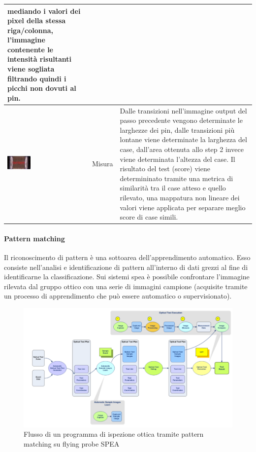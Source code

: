 \begin{tabularx}{\textwidth}{p{.3\linewidth} | p{.16\linewidth} |p{.45\linewidth}}
mediando i valori dei pixel della stessa riga/colonna, l’immagine contenente le intensità risultanti viene sogliata filtrando quindi i picchi non dovuti al pin.\\
\hline
\vspace{.5mm}
\includegraphics[width=0.3\textwidth]{img/smtcapacitor-measure.png}& Misura & Dalle transizioni nell’immagine output del passo precedente
vengono determinate le larghezze dei pin, dalle transizioni
più lontane viene determinate la larghezza del case,
dall’area ottenuta allo step 2 invece viene determinata
l’altezza del case.
Il risultato del test (score) viene determininato tramite una
metrica di similarità tra il case atteso e quello rilevato, una
mappatura non lineare dei valori viene applicata per
separare meglio score di case simili.
\end{tabularx}

\paragraph{Pattern matching}
Il riconoscimento di pattern è una sottoarea dell'apprendimento automatico. Esso consiste nell'analisi e
identificazione di pattern all'interno di dati grezzi al fine di identificarne la classificazione.
Sui sistemi spea è possibile confrontare l’immagine rilevata dal gruppo ottico con una serie di immagini
campione (acquisite tramite un processo di apprendimento che può essere automatico o supervisionato).


\begin{figure}[!ht]
\centering
\includegraphics[width=\textwidth]{img/patternmatching.png}
\caption{Flusso di un programma di ispezione ottica tramite pattern matching su flying probe SPEA}
\label{fig:pattern matching}
\end{figure}

